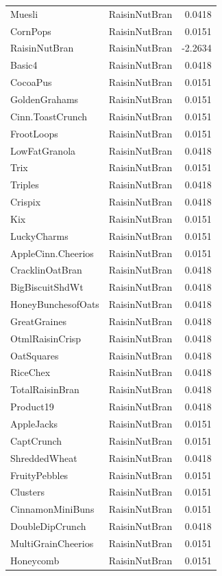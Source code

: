 \begin{longtable}{llr}
Muesli & RaisinNutBran & 0.0418 \\
CornPops & RaisinNutBran & 0.0151 \\
RaisinNutBran & RaisinNutBran & -2.2634 \\
Basic4 & RaisinNutBran & 0.0418 \\
CocoaPus & RaisinNutBran & 0.0151 \\
GoldenGrahams & RaisinNutBran & 0.0151 \\
Cinn.ToastCrunch & RaisinNutBran & 0.0151 \\
FrootLoops & RaisinNutBran & 0.0151 \\
LowFatGranola & RaisinNutBran & 0.0418 \\
Trix & RaisinNutBran & 0.0151 \\
Triples & RaisinNutBran & 0.0418 \\
Crispix & RaisinNutBran & 0.0418 \\
Kix & RaisinNutBran & 0.0151 \\
LuckyCharms & RaisinNutBran & 0.0151 \\
AppleCinn.Cheerios & RaisinNutBran & 0.0151 \\
CracklinOatBran & RaisinNutBran & 0.0418 \\
BigBiscuitShdWt & RaisinNutBran & 0.0418 \\
HoneyBunchesofOats & RaisinNutBran & 0.0418 \\
GreatGraines & RaisinNutBran & 0.0418 \\
OtmlRaisinCrisp & RaisinNutBran & 0.0418 \\
OatSquares & RaisinNutBran & 0.0418 \\
RiceChex & RaisinNutBran & 0.0418 \\
TotalRaisinBran & RaisinNutBran & 0.0418 \\
Product19 & RaisinNutBran & 0.0418 \\
AppleJacks & RaisinNutBran & 0.0151 \\
CaptCrunch & RaisinNutBran & 0.0151 \\
ShreddedWheat & RaisinNutBran & 0.0418 \\
FruityPebbles & RaisinNutBran & 0.0151 \\
Clusters & RaisinNutBran & 0.0151 \\
CinnamonMiniBuns & RaisinNutBran & 0.0151 \\
DoubleDipCrunch & RaisinNutBran & 0.0418 \\
MultiGrainCheerios & RaisinNutBran & 0.0151 \\
Honeycomb & RaisinNutBran & 0.0151 \\

\end{longtable}
